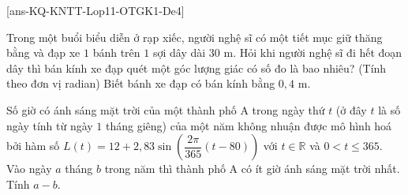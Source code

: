 
\caukq

[ans-KQ-KNTT-Lop11-OTGK1-De4]

\begin{ex}%
Trong một buổi biểu diễn ở rạp xiếc, người nghệ sĩ có một tiết mục giữ thăng bằng và đạp xe $1$ bánh trên $1$ sợi dây dài $30$ m. Hỏi khi người nghệ sĩ đi hết đoạn dây thì bán kính xe đạp quét một góc lượng giác có số đo là bao nhiêu? (Tính theo đơn vị radian) Biết bánh xe đạp có bán kính bằng $0{,}4$ m.
\end{ex}

\begin{ex}%
Số giờ có ánh sáng mặt trời của một thành phố A trong ngày thứ $t$ (ở đây $t$ là số ngày tính từ ngày $1$ tháng giêng) của một năm không nhuận được mô hình hoá bởi hàm số $L(t)=12+2{,}83\sin \left(\dfrac{2\pi}{365}(t-80)\right)$ với $t\in \mathbb{R}$ và $0<t\le 365$. Vào ngày $a$ tháng $b$ trong năm thì thành phố A có ít giờ ánh sáng mặt trời nhất. Tính $a-b$.
\end{ex}

